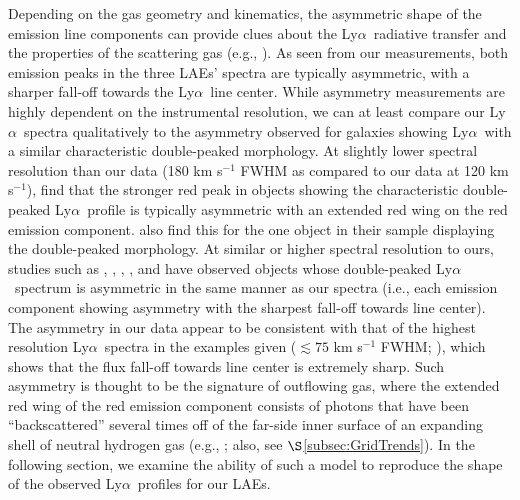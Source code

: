 \documentclass{emulateapj}
\newcommand{\lya}{Ly$\alpha$}
\begin{document}
Depending on the gas geometry and kinematics, the asymmetric shape of the emission line components can provide clues about the \lya\ radiative transfer and the properties of the scattering gas (e.g., \citealp{verhamme2006,zheng2010,schaerer2011,christensen2012,noterdaeme2012}). As seen from our measurements, both emission peaks in the three LAEs' spectra are typically asymmetric, with a sharper fall-off towards the \lya\ line center. While asymmetry measurements are highly dependent on the instrumental resolution, we can at least compare our \lya\ spectra qualitatively to the asymmetry observed for galaxies showing \lya\ with a similar characteristic double-peaked morphology. At slightly lower spectral resolution than our data (180 km s$^{-1}$ FWHM as compared to our data at 120 km s$^{-1}$), \citet{yamada2012} find that the stronger red peak in objects showing the characteristic double-peaked \lya\ profile is typically asymmetric with an extended red wing on the red emission component. \citet{mclinden2011} also find this for the one object in their sample displaying the double-peaked morphology. At similar or higher spectral resolution to ours, studies such as \citet{fynbo2010}, \citet{heckman2011}, \citet{yang2011}, \citet{noterdaeme2012}, and \citet{christensen2012} have observed objects whose double-peaked \lya\ spectrum is asymmetric in the same manner as our spectra (i.e., each emission component showing asymmetry with the sharpest fall-off towards line center). The asymmetry in our data appear to be consistent with that of the highest resolution \lya\ spectra in the examples given ($\lesssim75$ km s$^{-1}$ FWHM; \citealp{christensen2012}), which shows that the flux fall-off towards line center is extremely sharp. Such asymmetry is thought to be the signature of outflowing gas, where the extended red wing of the red emission component consists of photons that have been ``backscattered'' several times off of the far-side inner surface of an expanding shell of neutral hydrogen gas (e.g., \citealp{verhamme2006}; also, see $\S$\ref{subsec:GridTrends}). In the following section, we examine the ability of such a model to reproduce the shape of the observed \lya\ profiles for our LAEs.

\end{document}

